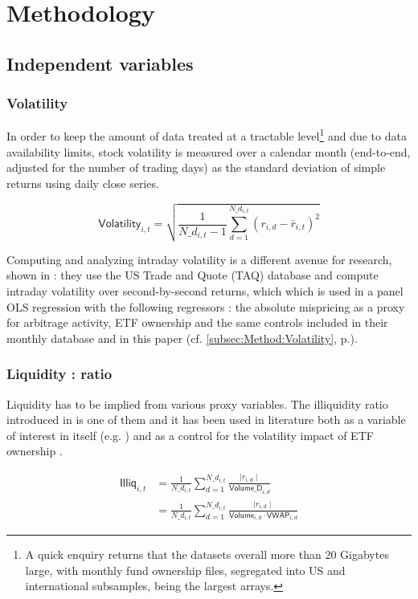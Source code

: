 \section{Methodology}
\label{sec:Methodology}
\subsection{Independent variables}
\subsubsection{Volatility}
In order to keep the amount of data treated at a tractable level\footnote{A quick enquiry returns that the datasets overall more than 20 Gigabytes large, with monthly fund ownership files, segregated into US and international subsamples, being the largest arrays.} and due to data availability limits, stock volatility is measured over a calendar month (end-to-end, adjusted for the number of trading days) as the standard deviation of simple returns using daily close series.

\begin{equation}
  \mathsf{Volatility}_{i, t} = \sqrt{\frac{1}{N\_d_{i, t} - 1} \sum_{d = 1}^{N\_d_{i, t}} (r_{i, d} - \bar{r}_{i, t})^2}
  \end{equation}

Computing and analyzing intraday volatility is a different avenue for research, shown in \textcite{Ben-David2018} : they use the US Trade and Quote (TAQ) database and compute intraday volatility over second-by-second returns, which which is used in a panel OLS regression with the following regressors : the absolute mispricing as a proxy for arbitrage activity, ETF ownership and the same controls included in their monthly database and in this paper (cf. \autoref{subsec:Method:Volatility}, p.\pageref{subsec:Method:Volatility}).
\subsubsection{Liquidity : \textcite{Amihud2002} ratio}
\label{sec:Methodology:sub:Independent:sub:Liquidity}
Liquidity has to be implied from various proxy variables. The illiquidity ratio introduced in \textcite{Amihud2002} is one of them and it has been used in literature both as a variable of interest in itself (e.g. \textcite{Israeli2017}) and as a control for the volatility impact of ETF ownership \parencite{Ben-David2018}.

\begin{equation}
  \begin{split}
    \mathsf{Illiq}_{i, t} & = \frac{1}{N\_d_{i, t}} \sum_{d = 1}^{N\_d_{i, t}} \frac{\mid r_{i, d} \mid}{\mathsf{Volume\_D}_{i, d}}\\
    &  = \frac{1}{N\_d_{i, t}} \sum_{d = 1}^{N\_d_{i, t}} \frac{\mid r_{i, d} \mid}{\mathsf{Volume}_{i, d} \cdot \mathsf{VWAP}_{i, d}}
    \end{split}
\end{equation}

